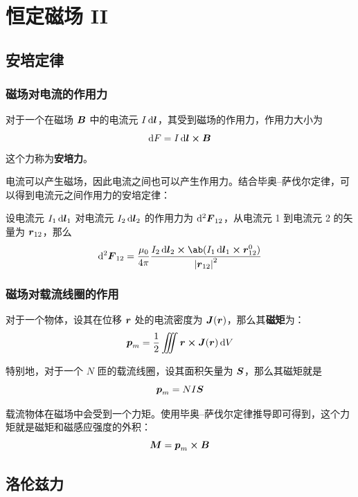 \section{恒定磁场 II}

\subsection{安培定律}

\subsubsection{磁场对电流的作用力}

\begin{definition}[安培力]
	对于一个在磁场 $\boldsymbol{B}$ 中的电流元 $I \dd{\boldsymbol{l}}$，其受到磁场的作用力，作用力大小为
	$$
	\dd{F} = I \dd{\vect{l}} \cp \vect{B}
	$$
	这个力称为\textbf{安培力}。
\end{definition}

电流可以产生磁场，因此电流之间也可以产生作用力。结合毕奥--萨伐尔定律，可以得到电流元之间作用力的安培定律：

\begin{theorem}[安培定律]
	设电流元 $I_1 \dd{\boldsymbol{l}_1}$ 对电流元 $I_2 \dd{\boldsymbol{l}_2}$ 的作用力为 $\dd[2]{\boldsymbol{F}_{12}}$，从电流元 1 到电流元 2 的矢量为 $\boldsymbol{r}_{12}$，那么
	$$
	\dd[2]{\vect{F}_{12}} = \frac{\mu_0}{4\pi} \frac{I_2 \dd{\vect{l}_2} \cp \ab(I_1 \dd{\vect{l}}_1 \cp \vect{r}_{12}^0)}{\abs{\vect{r}_{12}}^2}
	$$
\end{theorem}

\subsubsection{磁场对载流线圈的作用}

\begin{definition}[磁矩]
	对于一个物体，设其在位移 $\boldsymbol{r}$ 处的电流密度为 $\boldsymbol{J}(\boldsymbol{r})$，那么其\textbf{磁矩}为：
	$$
	\vect{p}_m = \frac{1}{2} \iiint \vect{r} \cp \vect{J}(\vect{r}) \dd{V}
	$$
\end{definition}

特别地，对于一个 $N$ 匝的载流线圈，设其面积矢量为 $\boldsymbol{S}$，那么其磁矩就是
$$
\boldsymbol{p}_m = N I \boldsymbol{S}
$$

载流物体在磁场中会受到一个力矩。使用毕奥--萨伐尔定律推导即可得到，这个力矩就是磁矩和磁感应强度的外积：
$$
\vect{M} = \vect{p}_m \cp \vect{B}
$$

\subsection{洛伦兹力}

